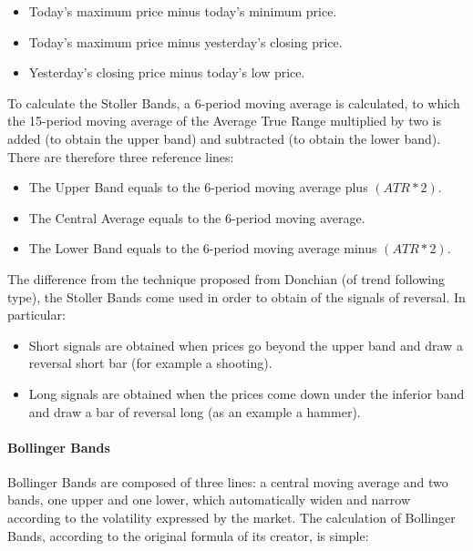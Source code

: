 \begin{itemize}
\setlength\itemsep{0.3em}
\item Today's maximum price minus today's minimum price.
\item Today's maximum price minus yesterday's closing price.
\item Yesterday's closing price minus today's low price.
\end{itemize}  


To calculate the Stoller Bands, a 6-period moving average is calculated, to which the 15-period moving average of the Average True Range multiplied by two is added (to obtain the upper band) and subtracted (to obtain the lower band).
There are therefore three reference lines:

\begin{itemize}
\setlength\itemsep{0.3em}
\item The Upper Band equals to the 6-period moving average plus $(ATR*2)$.
\item The Central Average equals to the 6-period moving average.
\item The Lower Band equals to the 6-period moving average minus $(ATR*2)$.
\end{itemize}  


The difference from the technique proposed from Donchian (of trend following type), the Stoller Bands come used in order to obtain of the signals of reversal. In particular:

\begin{itemize}
\setlength\itemsep{0.3em}
\item Short signals are obtained when prices go beyond the upper band and draw a reversal short bar (for example a shooting).
\item Long signals are obtained when the prices come down under the inferior band and draw a bar of reversal long (as an example a hammer).
\end{itemize} 

\paragraph{\textbf{Bollinger Bands}}\mbox{}

Bollinger Bands are composed of three lines: a central moving average and two bands, one upper and one lower, which automatically widen and narrow according to the volatility expressed by the market. The calculation of Bollinger Bands, according to the original formula of its creator, is simple: 

